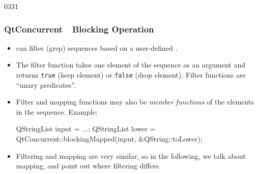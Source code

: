 \begin{slide}[fragile]{0331}
\frametitle{QtConcurrent~\textemdash~Blocking Operation}
  \begin{itemize}
  \item {} can filter (grep) sequences based on a
    user-defined \emph{}.
  \item The filter function takes one element of the sequence as an
    argument and returns \texttt{true} (keep element) or
    \texttt{false} (drop element). Filter functions are ``unary predicates''.
  \item Filter and mapping functions may also be \emph{member
      functions} of the elements in the sequence.
    Example:%
\begin{cpp}
QStringList input = ...;
QStringList lower = 
  QtConcurrent::blockingMapped(input, &QString::toLower);
\end{cpp}
  \item Filtering and mapping are very similar, so in the following,
    we talk about mapping, and point out where filtering differs.
  \end{itemize}
\end{slide}
